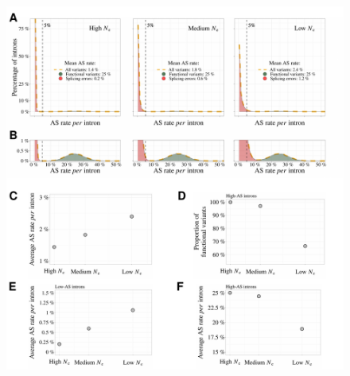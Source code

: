 \newpage

\begin{figure}[h!]   
        \centering                                                                        
        \includegraphics[scale=0.6] {Figure7.pdf}                                                               

\end{figure}
